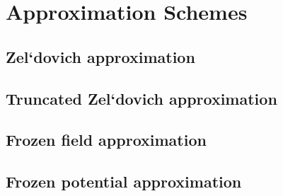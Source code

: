 \chapter{Approximation Schemes}

\section{Zel`dovich approximation}

\section{Truncated Zel`dovich approximation}

\section{Frozen field approximation}

\section{Frozen potential approximation}
